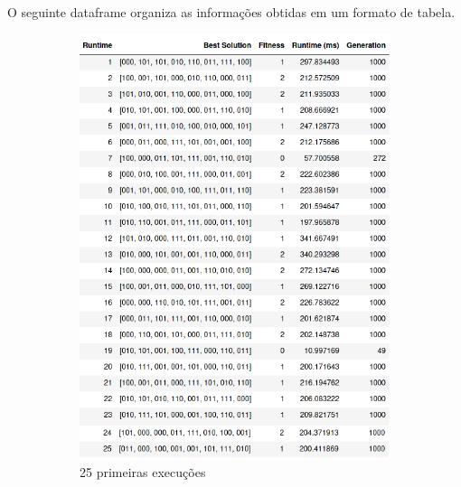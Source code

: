 O seguinte dataframe organiza as informações obtidas em um formato de tabela.



\begin{figure}[H]
	\centering
	\begin{subfigure}{.5\textwidth}
		\centering
		\includegraphics[scale=.5]{img/df1}
		\caption{25 primeiras execuções}
	\end{subfigure}%
	\begin{subfigure}{.5\textwidth}
		\centering

\end{subfigure}
\end{figure}
